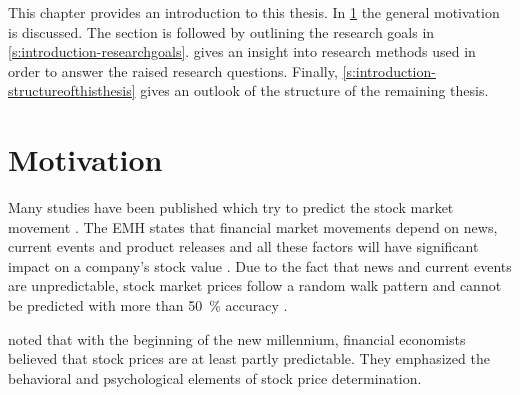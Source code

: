 



This chapter provides an introduction to this thesis.
In \cref{s:introduction-motivation} the general motivation is discussed.
The section is followed by outlining the research goals in \cref{s:introduction-researchgoals}.
 gives an insight into research methods used in order to answer the raised research questions.
Finally, \cref{s:introduction-structureofthisthesis} gives an outlook of the structure of the remaining thesis.

\section{Motivation}
\label{s:introduction-motivation}

Many studies have been published which try to predict the stock market movement \citep[see][]{Bollen2011a,Mittal2012a,Nguyen2015a,Pagolu2016a,Zhang2011a}.
The \ac{EMH} states that financial market movements depend on news, current events and product releases and all these factors will have significant impact on a company's stock value
\citep{fama1965behavior}.
Due to the fact that news and current events are unpredictable, stock market prices follow a random walk pattern and cannot be predicted with more than \SI{50}{\percent} accuracy
\citep{Pagolu2016a}.

\citet{Malkiel2003} noted that with the beginning of the new millennium, financial economists believed that stock prices are at least partly predictable.
They emphasized the behavioral and psychological elements of stock price determination.

